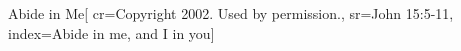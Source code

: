 {Abide in Me}[
    cr={Copyright 2002.  Used by permission.},
    sr={John 15:5-11},
    index={Abide in me, and I in you}]
